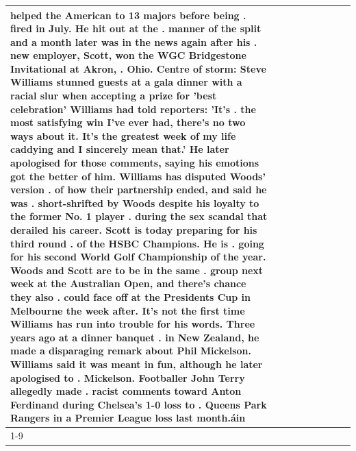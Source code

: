\begin{table}[H]
\begin{tabular}{lllrlllll}
helped the American to 13 majors before being . fired in July. He hit out at the . manner of the split and a month later was in the news again after his . new employer, Scott, won the WGC Bridgestone Invitational at Akron, . Ohio. Centre of storm: Steve Williams stunned guests at a gala dinner with a racial slur when accepting a prize for 'best celebration' Williams had told reporters: 'It's . the most satisfying win I've ever had, there's no two ways about it. It's the greatest week of my life caddying and I sincerely mean that.' He later apologised for those comments, saying his emotions got the better of him. Williams has disputed Woods' version . of how their partnership ended, and said he was . short-shrifted by Woods despite his loyalty to the former No. 1 player . during the sex scandal that derailed his career. Scott is today preparing for his third round . of the HSBC Champions. He is . going for his second World Golf Championship of the year. Woods and Scott are to be in the same . group next week at the Australian Open, and there's chance they also . could face off at the Presidents Cup in Melbourne the week after. It's not the first time Williams has run into trouble for his words. Three years ago at a dinner banquet . in New Zealand, he made a disparaging remark about Phil Mickelson. Williams said it was meant in fun, although he later apologised to . Mickelson. Footballer John Terry allegedly made . racist comments toward Anton Ferdinand during Chelsea's 1-0 loss to . Queens Park Rangers in a Premier League loss last month.áin \\
\cline{1-9}

\end{tabular}
\end{table}
